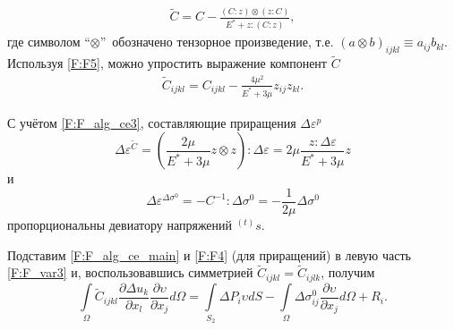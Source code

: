 \documentclass[]{article}
\begin{document}
\begin{equation}
\begin{gathered}
\tilde{C}=C-\frac{\left(C:z\right)\otimes \left(z:C\right) }{E^{*}+z:\left(C:z\right)},
\label{F:F_alg_C_pl}
\end{gathered}
\end{equation}
где символом \textquotedblleft $\otimes$\textquotedblright \ обозначено тензорное произведение, т.е. $\left( a\otimes b\right)_{ijkl} \equiv a_{ij}b_{kl}$.
Используя \eqref{F:F5}, можно упростить выражение компонент $\tilde{C}$
\begin{equation}
\begin{gathered}
\tilde{C}_{ijkl}=C_{ijkl}-\frac{4\mu^2}{E^{*}+3\mu}z_{ij}z_{kl}.
\label{F:F_alg_C_pl_parts}
\end{gathered}
\end{equation}

С учётом \eqref{F:F_alg_ce3}, составляющие приращения $\Delta\varepsilon^{p}$
\begin{equation}
\Delta\varepsilon^{\tilde{C}}=\left(\frac{2\mu}{E^{*}+3\mu}z\otimes z\right):\Delta\varepsilon=2\mu\frac{z:\Delta\varepsilon}{E^{*}+3\mu}z
\label{F:F_alg_ce13}
\end{equation}
и
\begin{equation}
\Delta\varepsilon^{\Delta\sigma^{0}}=-C^{-1}:\Delta\sigma^{0}=-\frac{1}{2\mu}\Delta\sigma^{0}
\label{F:F_alg_ce14}
\end{equation}
пропорциональны девиатору напряжений ${}^{(t)}s$.

Подставим \eqref{F:F_alg_ce_main} и \eqref{F:F4} (для приращений) в левую часть \eqref{F:F_var3} и, воспользовавшись симметрией \mbox{$\tilde{C}_{ijkl}=\tilde{C}_{ijlk}$}, получим 
\begin{equation}
\int\limits_{\Omega}\tilde{C}_{ijkl} \frac{\partial \Delta u_{k}}{\partial x_{l}} \frac{\partial\upsilon}{\partial x_j}d\Omega=\int\limits_{S_{2}}\Delta P_{i}\upsilon dS - \int\limits_{\Omega}\Delta\sigma_{ij}^{0}\frac{\partial\upsilon}{\partial x_j}d\Omega+R_{i}.
\label{F:F_alg_var1}
\end{equation}
\end{document}
